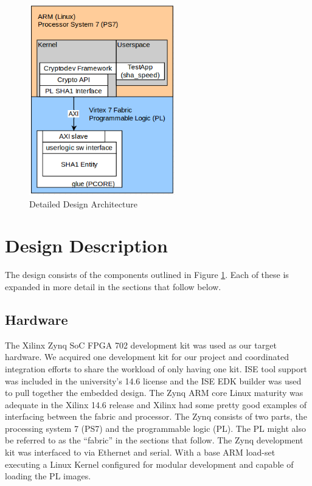 \documentclass[journal]{IEEEtran}
\begin{document}
\begin{figure}[ht]
\centering
\includegraphics[width=2.5in]{lowleveldesigndiagram.png}
\caption{Detailed Design Architecture}
\label{fig_archBlkDetailed}
\end{figure} 


\section{Design Description}
The design consists of the components outlined in Figure \ref{fig_archBlkDetailed}.  Each of these is expanded in more detail in the sections that follow below.
\subsection{Hardware}
The Xilinx Zynq SoC FPGA 702 development kit was used as our target hardware. We acquired one development kit for our project and coordinated integration efforts to share the workload of only having one kit.  ISE tool support was included in the university's 14.6 license and the ISE EDK builder was used to pull together the embedded design. The Zynq ARM core Linux maturity was adequate in the Xilinx 14.6 release and Xilinx had some pretty good examples of interfacing between the fabric and processor. \cite{XIL2013} \cite{XILGNU2013}   The Zynq consists of two parts, the processing system 7 (PS7) and the programmable logic (PL). The PL might also be referred to as the “fabric” in the sections that follow.  The Zynq development kit was interfaced to via Ethernet and serial. With a base ARM load-set executing a Linux Kernel conﬁgured for modular development and capable of loading the PL images.
\end{document}
